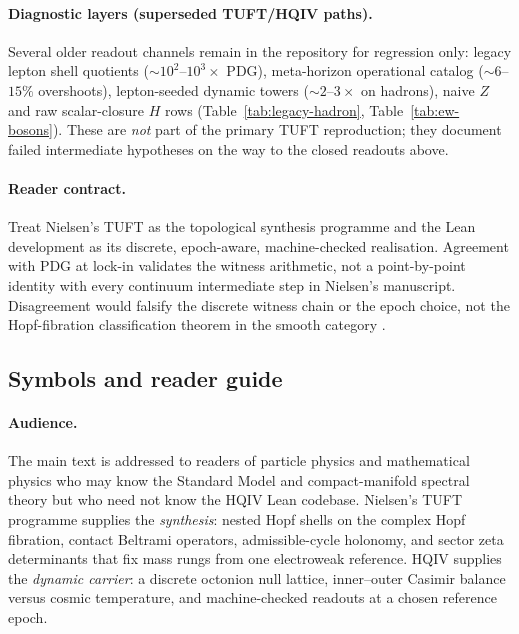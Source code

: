 \documentclass[11pt]{amsart}
\begin{document}
\paragraph{Diagnostic layers (superseded TUFT/HQIV paths).}
Several older readout channels remain in the repository for regression only: legacy lepton shell quotients ($\sim 10^2$--$10^3\times$ PDG), meta-horizon operational catalog ($\sim 6$--$15\%$ overshoots), lepton-seeded dynamic towers ($\sim 2$--$3\times$ on hadrons), naive $Z$ and raw scalar-closure $H$ rows (Table~\ref{tab:legacy-hadron}, Table~\ref{tab:ew-bosons}). These are \emph{not} part of the primary TUFT reproduction; they document failed intermediate hypotheses on the way to the closed readouts above.

\paragraph{Reader contract.}
Treat Nielsen's TUFT as the topological synthesis programme and the Lean development as its discrete, epoch-aware, machine-checked realisation. Agreement with PDG \cite{pdg2024} at lock-in validates the witness arithmetic, not a point-by-point identity with every continuum intermediate step in Nielsen's manuscript. Disagreement would falsify the discrete witness chain or the epoch choice, not the Hopf-fibration classification theorem in the smooth category \cite{hopf1931,Milnor1956,steenrod1951}.

\subsection{Symbols and reader guide}
\label{sec:reader-guide}

\paragraph{Audience.}
The main text is addressed to readers of particle physics and mathematical physics who may know the Standard Model \cite{pdg2024,peskin1995,schwartz2014} and compact-manifold spectral theory \cite{RaySinger1971,Geiges2008} but who need not know the HQIV Lean codebase. Nielsen's TUFT programme \cite{NielsenTUFT2026} supplies the \emph{synthesis}: nested Hopf shells on the complex Hopf fibration, contact Beltrami operators, admissible-cycle holonomy, and sector zeta determinants that fix mass rungs from one electroweak reference. HQIV supplies the \emph{dynamic carrier}: a discrete octonion null lattice, inner--outer Casimir balance versus cosmic temperature, and machine-checked readouts at a chosen reference epoch.
\end{document}
